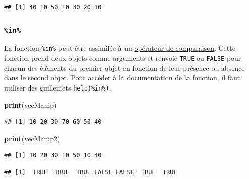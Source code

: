 \documentclass[twoside,symmetric]{book}
\newenvironment{Shaded}{}{}
\newcommand{\KeywordTok}[1]{\textbf{#1}}
\newcommand{\NormalTok}[1]{#1}
\newcommand{\OperatorTok}[1]{#1}
\newcommand{\StringTok}[1]{#1}
\begin{document}
\begin{verbatim}
## [1] 40 10 50 10 30 20 10
\end{verbatim}

\hypertarget{l015in}{%
\subsubsection{\texorpdfstring{\texttt{\%in\%}}{\%in\%}}\label{l015in}}

La fonction \texttt{\%in\%} peut être assimilée à un \protect\hyperlink{l011opcomp}{opérateur de comparaison}. Cette fonction prend deux objets comme arguments et renvoie \texttt{TRUE} ou \texttt{FALSE} pour chacun des éléments du premier objet en fonction de leur présence ou absence dans le second objet. Pour accéder à la documentation de la fonction, il faut utiliser des guillemets \texttt{help(\textquotesingle{}\%in\%\textquotesingle{})}.

\begin{Shaded}
\begin{Highlighting}[]
\KeywordTok{print}\NormalTok{(vecManip)}
\end{Highlighting}
\end{Shaded}

\begin{verbatim}
## [1] 10 20 30 70 60 50 40
\end{verbatim}

\begin{Shaded}
\begin{Highlighting}[]
\KeywordTok{print}\NormalTok{(vecManip2)}
\end{Highlighting}
\end{Shaded}

\begin{verbatim}
## [1] 10 20 30 10 50 10 40
\end{verbatim}

\begin{Shaded}
\end{Shaded}

\begin{verbatim}
## [1]  TRUE  TRUE  TRUE FALSE FALSE  TRUE  TRUE
\end{verbatim}

\begin{Shaded}
\end{Shaded}
\end{document}
